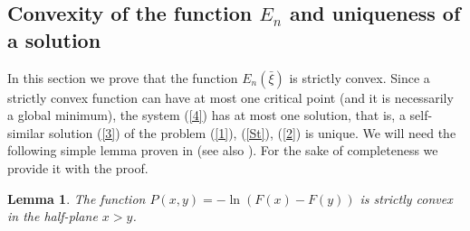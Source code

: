 \documentclass[10pt,a4paper]{amsart}
\newtheorem{lemma}{Lemma}[section]
\numberwithin{equation}{section}
\begin{document}
\subsection{Convexity of the function $E_n$ and uniqueness of a solution}

In this section we prove that the function $E_n(\bar\xi)$ is strictly convex. Since a strictly convex function can have at most one critical point (and it is necessarily a global minimum), the system (\ref{4}) has at most one solution, that is, a self-similar solution (\ref{3}) of the problem (\ref{1}), (\ref{St}), (\ref{2}) is unique. We will need the following simple lemma proven in \cite{Pan1} (see also \cite{Pan2}). For the sake of completeness we provide it with the proof.

\begin{lemma}\label{lem1}
The function $P(x,y)=-\ln (F(x)-F(y))$ is strictly convex in the half-plane $x>y$.
\end{lemma}
\end{document}

